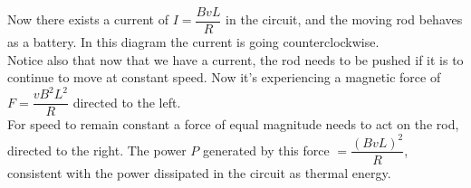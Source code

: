\begin{center}
\end{center}
Now there exists a current of $I=\dfrac{BvL}{R}$ in the circuit, and the moving rod behaves as a battery. In this diagram the current is going counterclockwise. \\
Notice also that now that we have a current, the rod needs to be pushed if it is to continue to move at constant speed. Now it's experiencing a magnetic force of $F=\dfrac{vB^2L^2}{R}$ directed to the left.\\
For speed to remain constant a force of equal magnitude needs to act on the rod, directed to the right. The power $P$ generated by this force $=\dfrac{(BvL)^2}{R}$, consistent with the power dissipated in the circuit as thermal energy.
